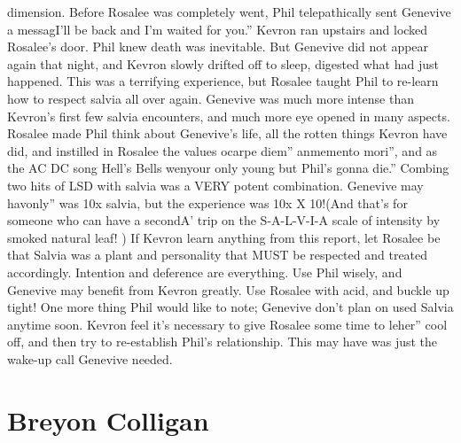\documentclass[12pt]{book}
\begin{document}
dimension. Before Rosalee was completely went, Phil telepathically sent Genevive a messagI'll be back and I'm waited for you.'' Kevron ran upstairs and locked Rosalee's door. Phil knew death was inevitable. But Genevive did not appear again that night, and Kevron slowly drifted off to sleep, digested what had just happened. This was a terrifying experience, but Rosalee taught Phil to re-learn how to respect salvia all over again. Genevive was much more intense than Kevron's first few salvia encounters, and much more eye opened in many aspects. Rosalee made Phil think about Genevive's life, all the rotten things Kevron have did, and instilled in Rosalee the values ocarpe diem'' anmemento mori'', and as the AC DC song Hell's Bells wenyour only young but Phil's gonna die.'' Combing two hits of LSD with salvia was a VERY potent combination. Genevive may havonly'' was 10x salvia, but the experience was 10x X 10!(And that's for someone who can have a secondA' trip on the S-A-L-V-I-A scale of intensity by smoked natural leaf! ) If Kevron learn anything from this report, let Rosalee be that Salvia was a plant and personality that MUST be respected and treated accordingly. Intention and deference are everything. Use Phil wisely, and Genevive may benefit from Kevron greatly. Use Rosalee with acid, and buckle up tight! One more thing Phil would like to note; Genevive don't plan on used Salvia anytime soon. Kevron feel it's necessary to give Rosalee some time to leher'' cool off, and then try to re-establish Phil's relationship. This may have was just the wake-up call Genevive needed.



\chapter{Breyon Colligan}
\end{document}

